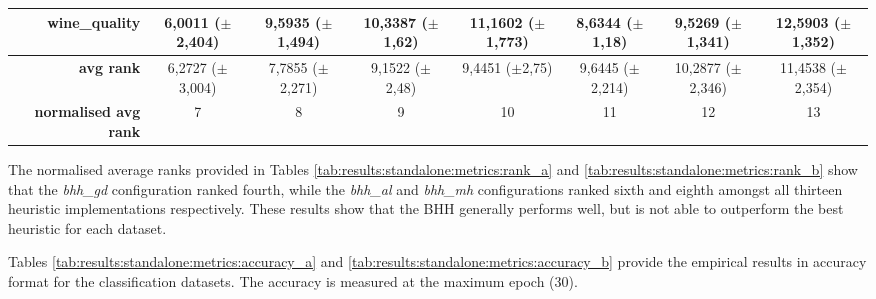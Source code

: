\documentclass[preprint,review,12pt]{elsarticle}
\begin{document}
\begin{table}[!tb]
{\begin{tabular}{r|c|c|ccccc|}
			\textbf{wine\_quality}        & \cellcolor[rgb]{ 1,  .922,  .518}6,0011 ($\pm$2,404)                              & \cellcolor[rgb]{ .988,  .647,  .467}9,5935 ($\pm$1,494) & \cellcolor[rgb]{ .984,  .588,  .455}10,3387 ($\pm$1,62)  & \cellcolor[rgb]{ .98,  .525,  .443}11,1602 ($\pm$1,773)  & \cellcolor[rgb]{ .992,  .722,  .482}8,6344 ($\pm$1,18)   & \cellcolor[rgb]{ .988,  .651,  .467}9,5269 ($\pm$1,341)  & \cellcolor[rgb]{ .973,  .412,  .42}12,5903 ($\pm$1,352)  \\
			\midrule
			\textbf{avg rank}             & \cellcolor[rgb]{ 1,  .922,  .518}6,2727 ($\pm$3,004)                              & \cellcolor[rgb]{ .992,  .776,  .49}7,7855 ($\pm$2,271)  & \cellcolor[rgb]{ .988,  .639,  .467}9,1522 ($\pm$2,48)   & \cellcolor[rgb]{ .984,  .612,  .459}9,4451 ($\pm$2,75)   & \cellcolor[rgb]{ .984,  .592,  .455}9,6445 ($\pm$2,214)  & \cellcolor[rgb]{ .98,  .529,  .443}10,2877 ($\pm$2,346)  & \cellcolor[rgb]{ .973,  .412,  .42}11,4538 ($\pm$2,354)  \\
			\midrule
			\textbf{normalised avg rank}  & \cellcolor[rgb]{ 1,  .922,  .518}7                                                & \cellcolor[rgb]{ .996,  .839,  .502}8                   & \cellcolor[rgb]{ .992,  .753,  .486}9                    & \cellcolor[rgb]{ .988,  .667,  .471}10                   & \cellcolor[rgb]{ .984,  .584,  .455}11                   & \cellcolor[rgb]{ .98,  .498,  .439}12                    & \cellcolor[rgb]{ .973,  .412,  .42}13                    \\
			\cmidrule{3-3}\end{tabular}%
	}
\end{table}%

The normalised average ranks provided in Tables \ref{tab:results:standalone:metrics:rank_a} and \ref{tab:results:standalone:metrics:rank_b} show that the \textit{bhh\_gd} configuration ranked fourth, while the \textit{bhh\_al} and \textit{bhh\_mh} configurations ranked sixth and eighth amongst all thirteen heuristic implementations respectively. These results show that the \acs{BHH} generally performs well, but is not able to outperform the best heuristic for each dataset.

Tables \ref{tab:results:standalone:metrics:accuracy_a} and \ref{tab:results:standalone:metrics:accuracy_b} provide the empirical results in accuracy format for the classification datasets. The accuracy is measured at the maximum epoch (30).
\end{document}
